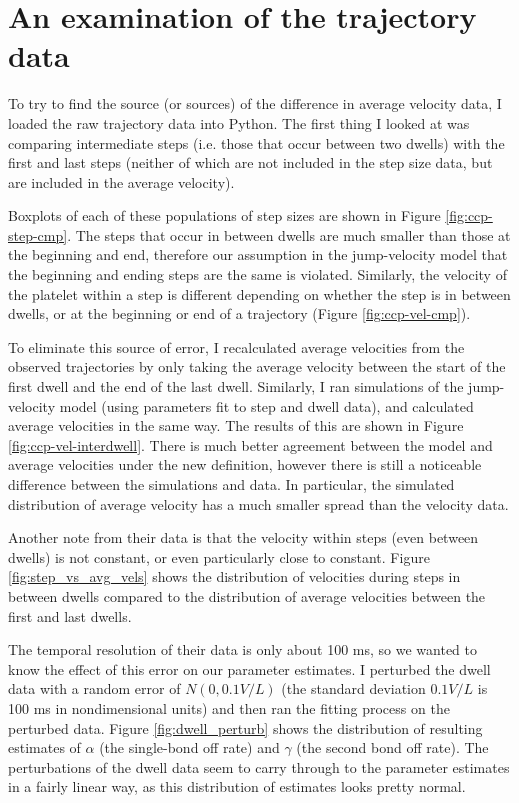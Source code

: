 \documentclass{article}
\begin{document}
\section{An examination of the trajectory data}
\label{sec:an-exam-traj}

To try to find the source (or sources) of the difference in average
velocity data, I loaded the raw trajectory data into Python. The first
thing I looked at was comparing intermediate steps (i.e. those that
occur between two dwells) with the first and last steps (neither of
which are not included in the step size data, but are included in the
average velocity).

Boxplots of each of these populations of step sizes are shown in
Figure \ref{fig:ccp-step-cmp}. The steps that occur in between dwells
are much smaller than those at the beginning and end, therefore our
assumption in the jump-velocity model that the beginning and ending
steps are the same is violated. Similarly, the velocity of the
platelet within a step is different depending on whether the step is
in between dwells, or at the beginning or end of a trajectory (Figure
\ref{fig:ccp-vel-cmp}).

To eliminate this source of error, I recalculated average velocities
from the observed trajectories by only taking the average velocity
between the start of the first dwell and the end of the last
dwell. Similarly, I ran simulations of the jump-velocity model (using
parameters fit to step and dwell data), and calculated average
velocities in the same way. The results of this are shown in Figure
\ref{fig:ccp-vel-interdwell}. There is much better agreement between
the model and average velocities under the new definition, however
there is still a noticeable difference between the simulations and
data. In particular, the simulated distribution of average velocity
has a much smaller spread than the velocity data.

Another note from their data is that the velocity within steps (even
between dwells) is not constant, or even particularly close to
constant. Figure \ref{fig:step_vs_avg_vels} shows the distribution of
velocities during steps in between dwells compared to the distribution
of average velocities between the first and last dwells.

The temporal resolution of their data is only about 100 ms, so we
wanted to know the effect of this error on our parameter estimates. I
perturbed the dwell data with a random error of $N(0, 0.1 V / L)$ (the
standard deviation $0.1V/L$ is 100 ms in nondimensional units) and
then ran the fitting process on the perturbed data. Figure
\ref{fig:dwell_perturb} shows the distribution of resulting estimates
of $\alpha$ (the single-bond off rate) and $\gamma$ (the second bond
off rate). The perturbations of the dwell data seem to carry through
to the parameter estimates in a fairly linear way, as this
distribution of estimates looks pretty normal.
\end{document}
